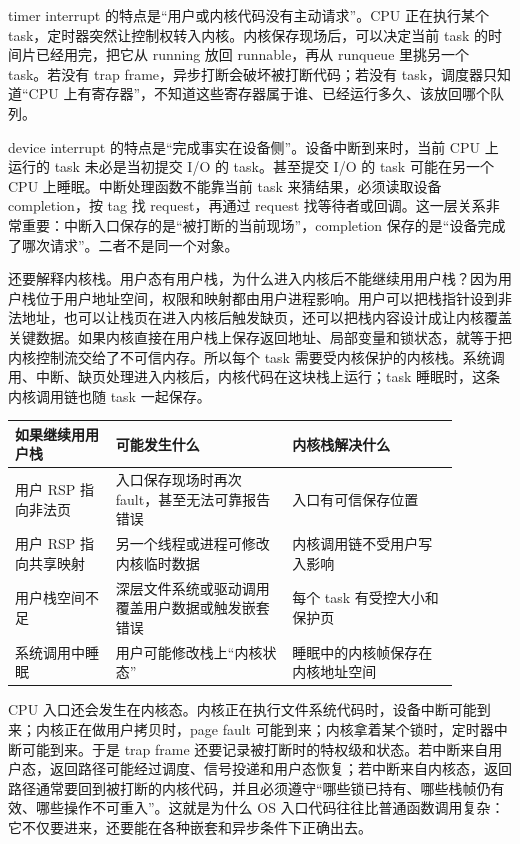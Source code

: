timer interrupt 的特点是“用户或内核代码没有主动请求”。CPU 正在执行某个 task，定时器突然让控制权转入内核。内核保存现场后，可以决定当前 task 的时间片已经用完，把它从 running 放回 runnable，再从 runqueue 里挑另一个 task。若没有 trap frame，异步打断会破坏被打断代码；若没有 task，调度器只知道“CPU 上有寄存器”，不知道这些寄存器属于谁、已经运行多久、该放回哪个队列。

device interrupt 的特点是“完成事实在设备侧”。设备中断到来时，当前 CPU 上运行的 task 未必是当初提交 I/O 的 task。甚至提交 I/O 的 task 可能在另一个 CPU 上睡眠。中断处理函数不能靠当前 task 来猜结果，必须读取设备 completion，按 tag 找 request，再通过 request 找等待者或回调。这一层关系非常重要：中断入口保存的是“被打断的当前现场”，completion 保存的是“设备完成了哪次请求”。二者不是同一个对象。

还要解释内核栈。用户态有用户栈，为什么进入内核后不能继续用用户栈？因为用户栈位于用户地址空间，权限和映射都由用户进程影响。用户可以把栈指针设到非法地址，也可以让栈页在进入内核后触发缺页，还可以把栈内容设计成让内核覆盖关键数据。如果内核直接在用户栈上保存返回地址、局部变量和锁状态，就等于把内核控制流交给了不可信内存。所以每个 task 需要受内核保护的内核栈。系统调用、中断、缺页处理进入内核后，内核代码在这块栈上运行；task 睡眠时，这条内核调用链也随 task 一起保存。

\begin{longtable}{p{0.2\linewidth}p{0.35\linewidth}p{0.33\linewidth}}
\toprule
如果继续用用户栈 & 可能发生什么 & 内核栈解决什么 \\
\midrule
用户 RSP 指向非法页 & 入口保存现场时再次 fault，甚至无法可靠报告错误 & 入口有可信保存位置 \\
用户 RSP 指向共享映射 & 另一个线程或进程可修改内核临时数据 & 内核调用链不受用户写入影响 \\
用户栈空间不足 & 深层文件系统或驱动调用覆盖用户数据或触发嵌套错误 & 每个 task 有受控大小和保护页 \\
系统调用中睡眠 & 用户可能修改栈上“内核状态” & 睡眠中的内核帧保存在内核地址空间 \\
\bottomrule
\end{longtable}

CPU 入口还会发生在内核态。内核正在执行文件系统代码时，设备中断可能到来；内核正在做用户拷贝时，page fault 可能到来；内核拿着某个锁时，定时器中断可能到来。于是 trap frame 还要记录被打断时的特权级和状态。若中断来自用户态，返回路径可能经过调度、信号投递和用户态恢复；若中断来自内核态，返回路径通常要回到被打断的内核代码，并且必须遵守“哪些锁已持有、哪些栈帧仍有效、哪些操作不可重入”。这就是为什么 OS 入口代码往往比普通函数调用复杂：它不仅要进来，还要能在各种嵌套和异步条件下正确出去。


